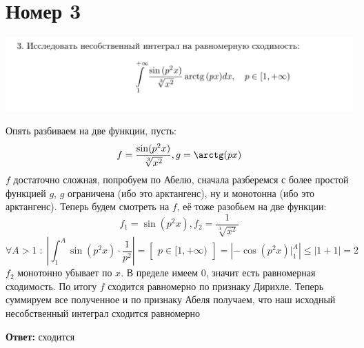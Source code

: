 \documentclass[a4paper,12pt]{article}
\begin{document}
\section*{Номер 3}
\begin{center}
\includegraphics[scale=0.4]{3.png}
\end{center}
Опять разбиваем на две функции, пусть:
\[
f = \frac{\sin (p^2 x)}{\sqrt[3]{x^2}}, g = \arctg(px)
\]
$f$ достаточно сложная, попробуем по Абелю, сначала разберемся с более простой функцией $g$, $g$ ограничена (ибо это арктангенс), ну и монотонна (ибо это арктангенс). Теперь будем смотреть на $f$, её тоже разобьем на две функции:
\[
f_1 = \sin(p^2 x), f_2 = \frac{1}{\sqrt[3]{x^2}}
\]
\[
\forall A > 1 \; : \; 
\left|
\int_1^{A} \sin (p^2 x) \cdot \frac{1}{p^2}
\right|
= 
\begin{bmatrix}
p \in [1, +\infty)
\end{bmatrix}
=
\left|
- \cos (p^2 x) \Bigg|_1^A 
\right|
\leq | 1 + 1 | 
= 2
\]
$f_2$ монотонно убывает по $x$. В пределе имеем 0, значит есть равномерная сходимость. По итогу $f$ сходится равномерно по признаку Дирихле. Теперь суммируем все полученное и по признаку Абеля получаем, что наш исходный несобственный интеграл сходится равномерно
\begin{center}
\textbf{Ответ:} сходится
\end{center}
\clearpage
\end{document}
